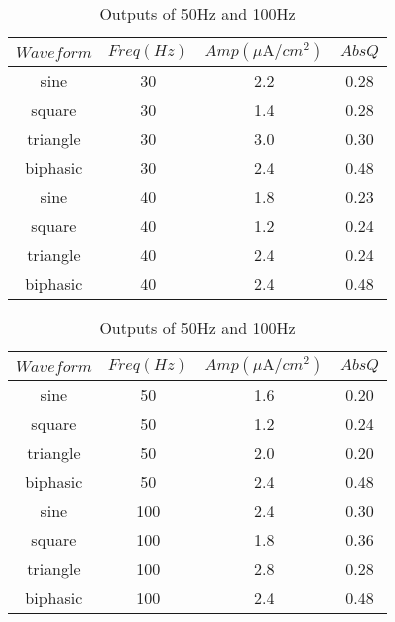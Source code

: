 \documentclass[letterpaper,12pt]{article}
\begin{document}
\begin{table}[H]
    \centering
    \scriptsize
    \begin{minipage}[t]{0.45\textwidth}
    \centering
    \begin{tabular}{|c|c|c|c|}
    \toprule
    \textbf{$Waveform$} & \textbf{$Freq(Hz)$}& \textbf{$Amp(\mu\text{A}/cm^2) $}  & \textbf{$AbsQ$} \\
    \midrule
    sine	 &30 &2.2	 &0.28 \\
    square	 &30 &1.4	 &0.28 \\
    triangle  &30 &3.0	 &0.30 \\
    biphasic &30 &2.4	 &0.48 \\
    sine	 &40 &1.8	 &0.23 \\
    square	 &40 &1.2	 &0.24 \\
    triangle  &40 &2.4	 &0.24 \\
    biphasic &40 &2.4	 &0.48 \\
    \bottomrule
    \end{tabular}
    \caption{Outputs of 30Hz and 40Hz}
    \end{minipage}\hfill
    \begin{minipage}[t]{0.45\textwidth}
    \centering
    \begin{tabular}{|c|c|c|c|}
    \toprule
    \textbf{$Waveform$} & \textbf{$Freq(Hz)$} & \textbf{$Amp(\mu\text{A}/cm^2) $}  & \textbf{$AbsQ$} \\
    \midrule
    sine	 &50 &1.6	 &0.20 \\
    square	 &50 &1.2	 &0.24 \\
    triangle  &50 &2.0	 &0.20 \\
    biphasic &50 &2.4	 &0.48 \\
    sine	 &100 &2.4	 &0.30 \\
    square	 &100 &1.8	 &0.36 \\
    triangle  &100 &2.8	 &0.28 \\
    biphasic &100 &2.4	 &0.48 \\
    \bottomrule
    \end{tabular}
    \caption{Outputs of 50Hz and 100Hz}
    \end{minipage}
\end{table}
\end{document}
